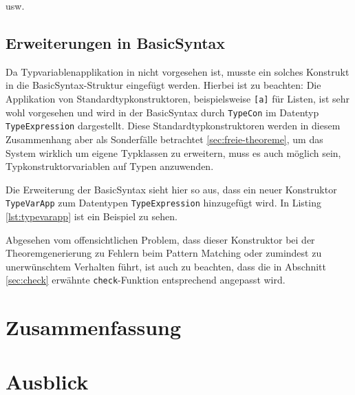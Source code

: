 \documentclass[11pt]{article} %
\begin{document}
usw.

\subsection{Erweiterungen in BasicSyntax}

Da Typvariablenapplikation in \cite{freetheorems} nicht vorgesehen ist, musste ein solches Konstrukt in die BasicSyntax-Struktur eingefügt werden. Hierbei ist zu beachten: Die Applikation
von Standardtypkonstruktoren, beispielsweise \texttt{[a]} für Listen, ist sehr wohl vorgesehen und wird in der BasicSyntax durch \texttt{TypeCon} im Datentyp \texttt{TypeExpression} dargestellt.  Diese Standardtypkonstruktoren werden in diesem Zusammenhang aber als Sonderfälle betrachtet \ref{sec:freie-theoreme}, um das System wirklich um eigene Typklassen zu erweitern, muss es auch möglich sein, Typkonstruktorvariablen auf Typen anzuwenden.

Die Erweiterung der BasicSyntax sieht hier so aus, dass ein neuer Konstruktor \texttt{TypeVarApp} zum Datentypen \texttt{TypeExpression} hinzugefügt wird. In Listing \ref{lst:typevarapp} ist ein Beispiel zu sehen.



Abgesehen vom offensichtlichen Problem, dass dieser Konstruktor bei der Theoremgenerierung zu Fehlern beim Pattern Matching oder zumindest zu unerwünschtem Verhalten führt,
ist auch zu beachten, dass die in Abschnitt \ref{sec:check} erwähnte \texttt{check}-Funktion entsprechend angepasst wird.

\section{Zusammenfassung}

\section{Ausblick}



\end{document}
